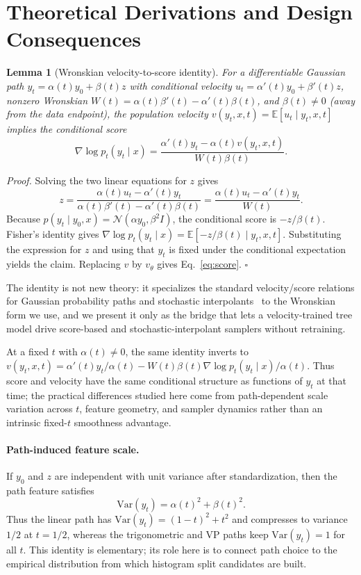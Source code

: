 \documentclass{article}
\newcommand{\E}{\mathbb{E}}
\newcommand{\Var}{\mathrm{Var}}
\newcommand{\Norm}{\mathcal{N}}
\newtheorem{lemma}{Lemma}
\begin{document}


\appendix

\section{Theoretical Derivations and Design Consequences}\label{app:theory}

\begin{lemma}[Wronskian velocity-to-score identity]\label{lem:wronskian-score}
For a differentiable Gaussian path $y_t=\alpha(t)y_0+\beta(t)z$ with conditional velocity $u_t=\alpha'(t)y_0+\beta'(t)z$, nonzero Wronskian $W(t)=\alpha(t)\beta'(t)-\alpha'(t)\beta(t)$, and $\beta(t)\neq0$ (away from the data endpoint), the population velocity $v(y_t,x,t)=\E[u_t\mid y_t,x,t]$ implies the conditional score
\[
\nabla \log p_t(y_t\mid x)=\frac{\alpha'(t)y_t-\alpha(t)v(y_t,x,t)}{W(t)\beta(t)}.
\]
\end{lemma}
\emph{Proof.} Solving the two linear equations for $z$ gives
\[
z=\frac{\alpha(t)u_t-\alpha'(t)y_t}{\alpha(t)\beta'(t)-\alpha'(t)\beta(t)}
  =\frac{\alpha(t)u_t-\alpha'(t)y_t}{W(t)}.
\]
Because $p(y_t\mid y_0,x)=\Norm(\alpha y_0,\beta^2 I)$, the conditional score is $-z/\beta(t)$. Fisher's identity gives $\nabla\log p_t(y_t\mid x)=\E[-z/\beta(t)\mid y_t,x,t]$. Substituting the expression for $z$ and using that $y_t$ is fixed under the conditional expectation yields the claim. Replacing $v$ by $v_\theta$ gives Eq.~\eqref{eq:score}. \hfill$\square$

The identity is not new theory: it specializes the standard velocity/score relations for Gaussian probability paths and stochastic interpolants~\citep{lipman2023flow,albergo2023stochastic} to the Wronskian form we use, and we present it only as the bridge that lets a velocity-trained tree model drive score-based and stochastic-interpolant samplers without retraining.

At a fixed $t$ with $\alpha(t)\neq0$, the same identity inverts to $v(y_t,x,t)=\alpha'(t)y_t/\alpha(t)-W(t)\beta(t)\nabla\log p_t(y_t\mid x)/\alpha(t)$. Thus score and velocity have the same conditional structure as functions of $y_t$ at that time; the practical differences studied here come from path-dependent scale variation across $t$, feature geometry, and sampler dynamics rather than an intrinsic fixed-$t$ smoothness advantage.

\paragraph{Path-induced feature scale.} If $y_0$ and $z$ are independent with unit variance after standardization, then the path feature satisfies
\[
\Var(y_t)=\alpha(t)^2+\beta(t)^2.
\]
Thus the linear path has $\Var(y_t)=(1-t)^2+t^2$ and compresses to variance $1/2$ at $t=1/2$, whereas the trigonometric and VP paths keep $\Var(y_t)=1$ for all $t$. This identity is elementary; its role here is to connect path choice to the empirical distribution from which histogram split candidates are built.
\end{document}
